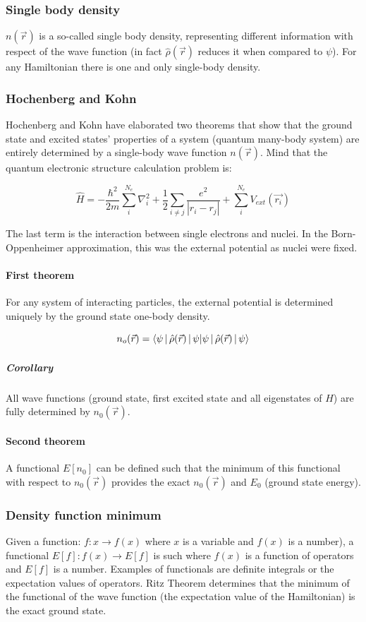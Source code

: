 		\subsubsection{Single body density}
		$n(\vec{r})$ is a so-called single body density, representing different information with respect of the wave function (in fact $\hat{\rho}(\vec{r})$ reduces it when compared to $\psi$).
		For any Hamiltonian there is one and only single-body density.

		\subsubsection{Hochenberg and Kohn}
		Hochenberg and Kohn have elaborated two theorems that show that the ground state and excited states' properties of a system (quantum many-body system) are entirely determined by a single-body wave function $n(\vec{r})$.
		Mind that the quantum electronic structure calculation problem is:

		$$\hat{H}=-\frac{\hbar^2}{2m}\sum_i^{N_e}\nabla_i^2+\frac{1}{2}\sum_{i\neq j} \frac{e^2}{|r_i-r_j|}+\sum_i^{N_e}V_{ext}(\vec{r_i})$$

		The last term is the interaction between single electrons and nuclei.
		In the Born-Oppenheimer approximation, this was the external potential as nuclei were fixed.

			\paragraph{First theorem}
			For any system of interacting particles, the external potential is determined uniquely by the ground state one-body density.

			$$n_o(\vec{r})=\braket{\psi\,|\,\hat{\rho}(\vec{r})\,|\,\psi}$$

				\subparagraph{Corollary}
				All wave functions (ground state, first excited state and all eigenstates of $\hat{H}$) are fully determined by $n_0(\vec{r})$.

			\paragraph{Second theorem}
			A functional $E[n_0]$ can be defined such that the minimum of this functional with respect to $n_0(\vec{r})$ provides the exact $n_0(\vec{r})$ and $E_0$ (ground state energy).\\

		\subsubsection{Density function minimum}
		Given a function: $f: x \rightarrow f(x)$ where $x$ is a variable and $f(x)$ is a number), a functional $E[f]: f(x) \rightarrow E[f]$ is such where $f(x)$ is a function of operators and $E[f]$ is a number.
		Examples of functionals are definite integrals or the expectation values of operators.
		Ritz Theorem determines that the minimum of the functional of the wave function (the expectation value of the Hamiltonian) is the exact ground state.

